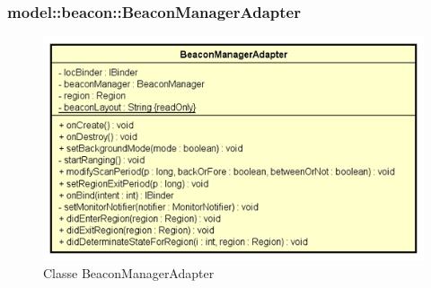 \documentclass[../DefinizioneDiProdotto.tex]{subfiles}
\begin{document}
\subsubsection{model::beacon::BeaconManagerAdapter}

    \begin{figure}[H]
        \centering
        \includegraphics{img/BeaconManagerAdapter.png}
        \caption{Classe BeaconManagerAdapter}\label{fig:model::beacon::BeaconManagerAdapter} 
    \end{figure}
\end{document}
